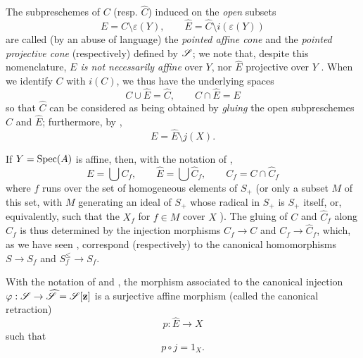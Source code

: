 \begin{env}[8.3.4]
\label{2.8.3.4}
The subpreschemes of $C$ (resp. $\widehat{C}$) induced on the \emph{open} subsets
\[
\label{eq:2.8.3.4.1}
  E = C \setminus \varepsilon(Y),
  \qquad
  \widehat{E} = \widehat{C} \setminus i(\varepsilon(Y))
\tag{8.3.4.1}
\]
are called (by an abuse of language) the \emph{pointed affine cone} and the \emph{pointed projective cone} (respectively) defined by $\mathscr{S}$;
we note that, despite this nomenclature, \emph{$E$ is not necessarily affine} over $Y$, nor $\widehat{E}$ projective over $Y$ .
When we identify $C$ with $i(C)$, we thus have the underlying spaces
\[
\label{eq:2.8.3.4.2}
  C \cup \widehat{E} = \widehat{C},
  \qquad
  C \cap \widehat{E} = E
\tag{8.3.4.2}
\]
so that $\widehat{C}$ can be considered as being obtained by \emph{gluing} the open subpreschemes $C$ and $\widehat{E}$;
furthermore, by ,
\[
\label{eq:2.8.3.4.3}
  E = \widehat{E} \setminus j(X).
\tag{8.3.4.3}
\]

If $Y=\operatorname{Spec}(A)$ is affine, then, with the notation of ,
\[
\label{eq:2.8.3.4.4}
  E = \bigcup C_f,
  \qquad
  \widehat{E} = \bigcup \widehat{C}_f,
  \qquad
  C_f = C \cap \widehat{C}_f
\tag{8.3.4.4}
\]
where $f$ runs over the set of homogeneous elements of $S_+$ (or only a subset $M$ of this set, with $M$ generating an ideal of $S_+$ whose radical in $S_+$ is $S_+$ itself, or, equivalently, such that the $X_f$ for $f\in M$ cover $X$ ).
The gluing of $C$ and $\widehat{C}_f$ along $C_f$ is thus determined by the injection morphisms $C_f\to C$ and $C_f\to\widehat{C}_f$, which, as we have seen , correspond (respectively) to the canonical homomorphisms $S\to S_f$ and $S_f^\leq\to S_f$.
\end{env}

\begin{proposition}[8.3.5]
\label{2.8.3.5}
With the notation of  and , the morphism associated  to the canonical injection $\varphi:\sh{S} \to \widehat{\sh{S}} = \sh{S}[\bb{z}]$ is a surjective affine morphism (called the canonical retraction)
\[
\label{eq:2.8.3.5.1}
  p:\widehat{E} \to X
\tag{8.3.5.1}
\]
such that
\[
\label{eq:2.8.3.5.2}
  p \circ j = 1_X.
\tag{8.3.5.2}
\]
\end{proposition}

